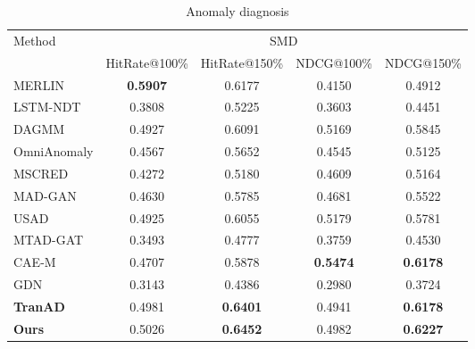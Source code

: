 \documentclass[a4paper,11pt]{article}
\date{\today}
\begin{document}
\begin{table}[H]
\centering
\caption{Anomaly diagnosis}
\label{tab:table2}
\tiny
\setlength{\tabcolsep}{2.6pt}
\begin{adjustbox}{width=0.99\linewidth}
\begin{minipage}{\linewidth}
\centering

\begin{tabular}{l*{4}{c}}
\toprule
\multirow{2}{*}{Method} & \multicolumn{4}{c}{SMD} \\
\cmidrule(lr){2-5}
& HitRate@100\% & HitRate@150\% & NDCG@100\% & NDCG@150\% \\
\midrule
MERLIN          & \textbf{0.5907} & 0.6177          & 0.4150          & 0.4912          \\
LSTM-NDT        & 0.3808          & 0.5225          & 0.3603          & 0.4451          \\
DAGMM           & 0.4927          & 0.6091          & 0.5169          & 0.5845          \\
OmniAnomaly     & 0.4567          & 0.5652          & 0.4545          & 0.5125          \\
MSCRED          & 0.4272          & 0.5180          & 0.4609          & 0.5164          \\
MAD-GAN         & 0.4630          & 0.5785          & 0.4681          & 0.5522          \\
USAD            & 0.4925          & 0.6055          & 0.5179          & 0.5781          \\
MTAD-GAT        & 0.3493          & 0.4777          & 0.3759          & 0.4530          \\
CAE-M           & 0.4707          & 0.5878          & \textbf{0.5474} & \textbf{0.6178} \\
GDN             & 0.3143          & 0.4386          & 0.2980          & 0.3724          \\
\textbf{TranAD} & 0.4981          & \textbf{0.6401} & 0.4941          & \textbf{0.6178} \\
\textbf{Ours} & 0.5026          & \textbf{0.6452} & 0.4982          & \textbf{0.6227} \\
\bottomrule
\end{tabular}


\end{minipage}
\end{adjustbox}
\end{table}
\end{document}
